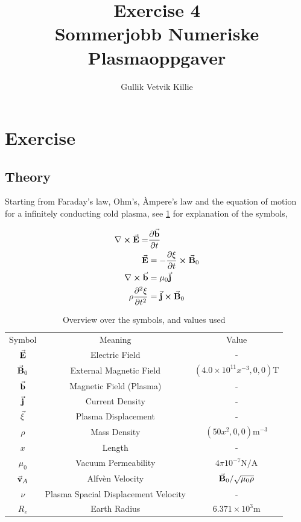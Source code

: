 \documentclass[x11names]{article}
\title{ Exercise 4 \\ Sommerjobb Numeriske Plasmaoppgaver }
\author{Gullik Vetvik Killie	}
\begin{document}
\maketitle

\section{Exercise}

\subsection{Theory}
  Starting from Faraday's law, Ohm's, Àmpere's law and the equation of motion for a infinitely conducting cold plasma, see \cref{tab:symbols} for explanation of the symbols,

  \begin{align}
    \nabla \cross \va{E} =& \pdv{\va{b}}{t} \label{eq:Faraday}
    \\
    \va{E} &= -\pdv{\xi}{t} \cross \va{B}_0 \label{eq:Ohm}
    \\
    \nabla \cross \va{b}  &= \mu_0\va{j}  \label{eq:Ampere}
    \\
    \rho \pdv[2]{\xi}{t} &= \va{j} \cross \va{B}_0 \label{eq:EOM}
  \end{align}

  \begin{table}
            \centering
            \begin{tabular}{| c | c | c |}
                 Symbol & Meaning & Value
                 \\
                 $\va{E}$ & Electric Field  & -
                 \\
                 $\va{B}_0$ & External Magnetic Field & \((4.0\times10^{11}x^{-3}, 0, 0) \si{\tesla}\)
                 \\
                 $\va{b}$ & Magnetic Field (Plasma) & -
                 \\
                 $\va{j}$ & Current Density & -
                 \\
                 $\va{\xi}$ & Plasma Displacement & -
                 \\
                 $\rho $ & Mass Density & \((50x^{2}, 0, 0) \si{\meter^{-3}}\)
                 \\
                 $ x $  & Length  & -
                 \\
                 $\mu_0 $ & Vacuum Permeability & $ 4\pi10^{-7} \si{\newton\per\ampere} $
                 \\
                 $\va{v}_A$ &  Alfvèn Velocity & $ \va{B}_0/\sqrt{\mu_0\rho}$ 
                 \\
                 $\nu$  & Plasma Spacial Displacement Velocity   & -
                 \\
                 $R_e$ & Earth Radius & $6.371\times 10^3 \si{\meter}$
            \end{tabular}
            \caption{Overview over the symbols, and values used}
            \label{tab:symbols}
      \end{table}
\end{document}
